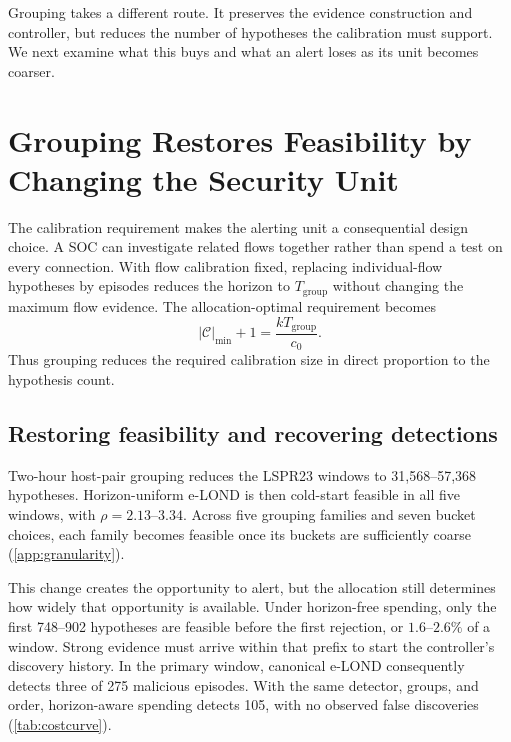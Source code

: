 \documentclass[conference]{IEEEtran}
\newcommand{\Cal}{\mathcal{C}}
\newcommand{\nCal}{\lvert\Cal\rvert}
\begin{document}
Grouping takes a different route. It preserves the evidence construction and controller, but reduces
the number of hypotheses the calibration must support. We next examine what this buys and what an
alert loses as its unit becomes coarser.

\section{Grouping Restores Feasibility by Changing the Security Unit}\label{sec:granularity}

The calibration requirement makes the alerting unit a consequential design choice. A SOC can
investigate related flows together rather than spend a test on every connection. With flow
calibration fixed, replacing individual-flow hypotheses by episodes reduces the horizon to
$T_{\mathrm{group}}$ without changing the maximum flow evidence. The allocation-optimal requirement
becomes
\begin{equation}\label{eq:exchange}
\nCal_{\min}+1=\frac{kT_{\mathrm{group}}}{c_0}.
\end{equation}
Thus grouping reduces the required calibration size in direct proportion to the hypothesis count.

\subsection{Restoring feasibility and recovering detections}\label{sec:feasnotdet}

Two-hour host-pair grouping reduces the LSPR23 windows to 31,568--57,368 hypotheses. Horizon-uniform
e-LOND is then cold-start feasible in all five windows, with $\rho=2.13$--$3.34$. Across five
grouping families and seven bucket choices, each family becomes feasible once its buckets are
sufficiently coarse (\cref{app:granularity}).

This change creates the opportunity to alert, but the allocation still determines how widely that
opportunity is available. Under horizon-free spending, only the first 748--902 hypotheses are
feasible before the first rejection, or $1.6$--$2.6\%$ of a window. Strong evidence must arrive
within that prefix to start the controller's discovery history. In the primary window, canonical
e-LOND consequently detects three of 275 malicious episodes. With the same detector, groups, and
order, horizon-aware spending detects 105, with no observed false discoveries
(\cref{tab:costcurve}).
\end{document}
